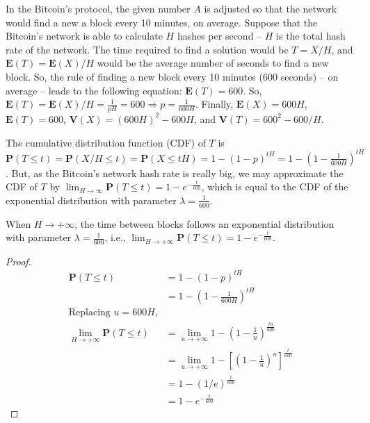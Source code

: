 
In the Bitcoin's protocol, the given number $A$ is adjusted so that the network would find a new a block every 10 minutes, on average. Suppose that the Bitcoin's network is able to calculate $H$ hashes per second -- $H$ is the total hash rate of the network. The time required to find a solution would be $T=X/H$, and $\mathbf{E}(T) = \mathbf{E}(X)/H$ would be the average number of seconds to find a new block. So, the rule of finding a new block every 10 minutes (600 seconds) -- on average -- leads to the following equation: $\mathbf{E}(T) = 600$. So, $\mathbf{E}(T) = \mathbf{E}(X)/H = \frac{1}{pH} = 600 \Rightarrow p = \frac{1}{600H}$. Finally, $\mathbf{E}(X) = 600H$, $\mathbf{E}(T) = 600$, $\mathbf{V}(X) = (600H)^2 - 600H$, and $\mathbf{V}(T) = 600^2 - 600/H$.

The cumulative distribution function (CDF) of $T$ is $\mathbf{P}(T \leq t) = \mathbf{P}(X/H \leq t) = \mathbf{P}(X \leq tH) = 1 - (1-p)^{tH} = 1 - \left( 1-\frac{1}{600H} \right)^{tH}$. But, as the Bitcoin's network hash rate is really big, we may approximate the CDF of $T$ by $\lim_{H \rightarrow \infty} \mathbf{P}(T \leq t) = 1 - e^{-\frac{t}{600}}$, which is equal to the CDF of the exponential distribution with parameter $\lambda = \frac{1}{600}$.

\begin{theorem}
	When $H \rightarrow +\infty$, the time between blocks follows an exponential distribution with parameter $\lambda = \frac{1}{600}$, i.e., $\lim_{H \rightarrow +\infty} \mathbf{P}(T \leq t) = 1 - e^{-\frac{t}{600}}$.
\end{theorem}
\begin{proof}
\begin{align*}
	\mathbf{P}(T \leq t) &= 1 - (1-p)^{tH} \\
		     &= 1 - \left( 1 - \frac{1}{600H} \right)^{tH} \\
	\text{Replacing $u = 600H$,} \\
	\lim_{H \rightarrow +\infty} \mathbf{P}(T \leq t) &= \lim_{u \rightarrow +\infty} 1 - \left( 1 - \frac{1}{u} \right)^{\frac{tu}{600}} \\
				&= \lim_{u \rightarrow +\infty} 1 - \left[ \left( 1 - \frac{1}{u} \right)^{u} \right]^{\frac{t}{600}} \\
				&= 1 - \left( 1/e \right)^{\frac{t}{600}} \\
				&= 1 - e^{-\frac{t}{600}}
\end{align*}
\end{proof}

